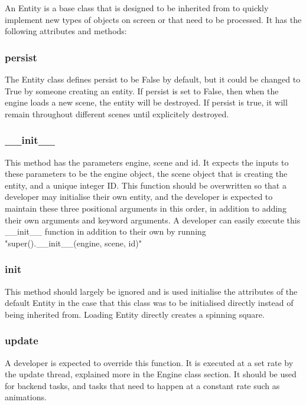 \documentclass{report}
\begin{document}
An Entity is a base class that is designed to be inherited from to quickly implement new types of objects on screen or that need to be processed. It has the following attributes and methods:

\subsubsection{persist}

The Entity class defines persist to be False by default, but it could be changed to True by someone creating an entity. If persist is set to False, then when the engine loads a new scene, the entity will be destroyed. If persist is true, it will remain throughout different scenes until explicitely destroyed.

\subsubsection{\_\_init\_\_}

This method has the parameters engine, scene and id. It expects the inputs to these parameters to be the engine object, the scene object that is creating the entity, and a unique integer ID. This function should be overwritten so that a developer may initialise their own entity, and the developer is expected to maintain these three positional arguments in this order, in addition to adding their own arguments and keyword arguments. A developer can easily execute this \_\_init\_\_ function in addition to their own by running "super().\_\_init\_\_(engine, scene, id)"

\subsubsection{init}

This method should largely be ignored and is used initialise the attributes of the default Entity in the case that this class was to be initialised directly instead of being inherited from. Loading Entity directly creates a spinning square.

\subsubsection{update}

A developer is expected to override this function. It is executed at a set rate by the update thread, explained more in the Engine class section. It should be used for backend tasks, and tasks that need to happen at a constant rate such as animations.
\end{document}
